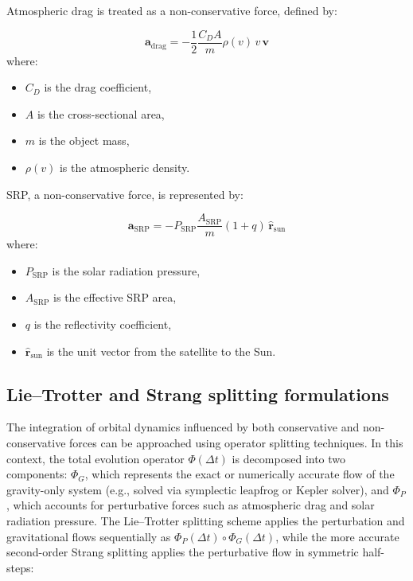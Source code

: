 \documentclass[letterpaper, preprint, paper,11pt]{AAS}	%
\begin{document}
Atmospheric drag is treated as a non-conservative force, defined by:

\begin{equation}
    \bm{a}_{\text{drag}} = -\frac{1}{2} \frac{C_D A}{m} \rho(v) \, v \, \bm{v}
\end{equation}
where:
\begin{itemize}
    \item $C_D$ is the drag coefficient,
    \item $A$ is the cross-sectional area,
    \item $m$ is the object mass,
    \item $\rho(v)$ is the atmospheric density.
\end{itemize}

SRP, a non-conservative force, is represented by:

\begin{equation}
    \bm{a}_{\text{SRP}} = -P_{\text{SRP}} \frac{A_{\text{SRP}}}{m} (1 + q) \, \hat{\bm{r}}_{\text{sun}}
\end{equation}
where:
\begin{itemize}
    \item $P_{\text{SRP}}$ is the solar radiation pressure,
    \item $A_{\text{SRP}}$ is the effective SRP area,
    \item $q$ is the reflectivity coefficient,
    \item $\hat{\bm{r}}_{\text{sun}}$ is the unit vector from the satellite to the Sun.
\end{itemize}

\subsection{Lie–Trotter and Strang splitting formulations}

The integration of orbital dynamics influenced by both conservative and non-conservative forces can be approached using operator splitting techniques. In this context, the total evolution operator $\Phi(\Delta t)$ is decomposed into two components: $\Phi_G$, which represents the exact or numerically accurate flow of the gravity-only system (e.g., solved via symplectic leapfrog or Kepler solver), and $\Phi_P$, which accounts for perturbative forces such as atmospheric drag and solar radiation pressure. The Lie–Trotter splitting scheme applies the perturbation and gravitational flows sequentially as $\Phi_P(\Delta t) \circ \Phi_G(\Delta t)$, while the more accurate second-order Strang splitting applies the perturbative flow in symmetric half-steps:
\end{document}
